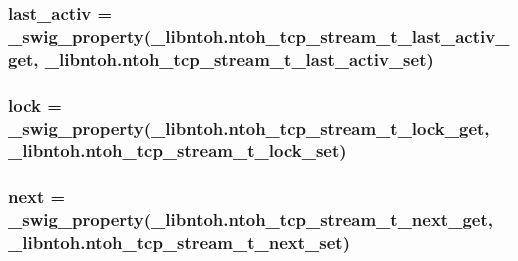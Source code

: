 \hypertarget{classlibntoh_1_1ntoh__tcp__stream__t_a43a06ba72aed8671dd1579dbf6f78b1a}{
\subsubsection[{last\-\_\-activ}]{ last\-\_\-activ = {\bf \-\_\-swig\-\_\-property}(\-\_\-libntoh.\-ntoh\-\_\-tcp\-\_\-stream\-\_\-t\-\_\-last\-\_\-activ\-\_\-get, \-\_\-libntoh.\-ntoh\-\_\-tcp\-\_\-stream\-\_\-t\-\_\-last\-\_\-activ\-\_\-set)\hspace{0.3cm}{\ttfamily [static]}}}\label{classlibntoh_1_1ntoh__tcp__stream__t_a43a06ba72aed8671dd1579dbf6f78b1a}
\hypertarget{classlibntoh_1_1ntoh__tcp__stream__t_a871c7bf899334194698c2a3bced5e064}{
\subsubsection[{lock}]{ lock = {\bf \-\_\-swig\-\_\-property}(\-\_\-libntoh.\-ntoh\-\_\-tcp\-\_\-stream\-\_\-t\-\_\-lock\-\_\-get, \-\_\-libntoh.\-ntoh\-\_\-tcp\-\_\-stream\-\_\-t\-\_\-lock\-\_\-set)\hspace{0.3cm}{\ttfamily [static]}}}\label{classlibntoh_1_1ntoh__tcp__stream__t_a871c7bf899334194698c2a3bced5e064}
\hypertarget{classlibntoh_1_1ntoh__tcp__stream__t_a84e6dac37062f5a539ece8248c8567cc}{
\subsubsection[{next}]{ next = {\bf \-\_\-swig\-\_\-property}(\-\_\-libntoh.\-ntoh\-\_\-tcp\-\_\-stream\-\_\-t\-\_\-next\-\_\-get, \-\_\-libntoh.\-ntoh\-\_\-tcp\-\_\-stream\-\_\-t\-\_\-next\-\_\-set)\hspace{0.3cm}{\ttfamily [static]}}}\label{classlibntoh_1_1ntoh__tcp__stream__t_a84e6dac37062f5a539ece8248c8567cc}
